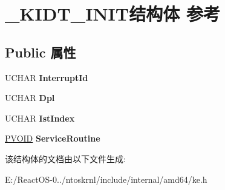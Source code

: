 \hypertarget{struct___k_i_d_t___i_n_i_t}{}\section{\+\_\+\+K\+I\+D\+T\+\_\+\+I\+N\+I\+T结构体 参考}
\label{struct___k_i_d_t___i_n_i_t}
\subsection*{Public 属性}
\begin{DoxyCompactItemize}
\item 
\mbox{\label{struct___k_i_d_t___i_n_i_t_acbd2f87219a215df7fbc34b5dacc9e06}} 
U\+C\+H\+AR {\bfseries Interrupt\+Id}
\item 
\mbox{\label{struct___k_i_d_t___i_n_i_t_a119b7437d15010725db192fb0fa872ca}} 
U\+C\+H\+AR {\bfseries Dpl}
\item 
\mbox{\label{struct___k_i_d_t___i_n_i_t_a96496a84057692549b7f1a0f1fbcd7c7}} 
U\+C\+H\+AR {\bfseries Ist\+Index}
\item 
\mbox{\label{struct___k_i_d_t___i_n_i_t_aaa5584a9018a1a5b7bd381eed84872dd}} 
\hyperlink{interfacevoid}{P\+V\+O\+ID} {\bfseries Service\+Routine}
\end{DoxyCompactItemize}


该结构体的文档由以下文件生成\+:\begin{DoxyCompactItemize}
\item 
E\+:/\+React\+O\+S-\/0../ntoskrnl/include/internal/amd64/ke.\+h\end{DoxyCompactItemize}
